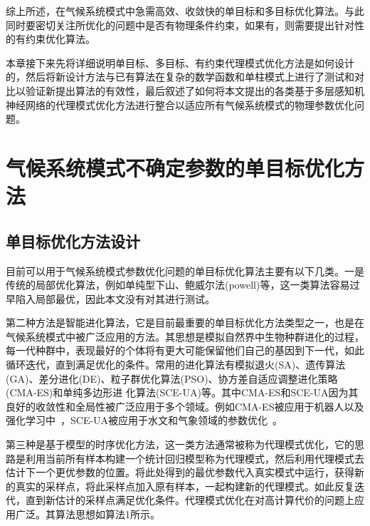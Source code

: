 综上所述，在气候系统模式中急需高效、收敛快的单目标和多目标优化算法。与此同时要密切关注所优化的问题中是否有物理条件约束，如果有，则需要提出针对性的有约束优化算法。

本章接下来先将详细说明单目标、多目标、有约束代理模式优化方法是如何设计的，然后将新设计方法与已有算法在复杂的数学函数和单柱模式上进行了测试和对比以验证新提出算法的有效性，最后叙述了如何将本文提出的各类基于多层感知机神经网络的代理模式优化方法进行整合以适应所有气候系统模式的物理参数优化问题。


\section{气候系统模式不确定参数的单目标优化方法}
\subsection{单目标优化方法设计}
目前可以用于气候系统模式参数优化问题的单目标优化算法主要有以下几类。一是传统的局部优化算法，例如单纯型下山、鲍威尔法(powell)等，这一类算法容易过早陷入局部最优，因此本文没有对其进行测试。

第二种方法是智能进化算法，它是目前最重要的单目标优化方法类型之一，也是在气候系统模式中被广泛应用的方法。其思想是模拟自然界中生物种群进化的过程，每一代种群中，表现最好的个体将有更大可能保留他们自己的基因到下一代，如此循环迭代，直到满足优化的条件。常用的进化算法有模拟退火(SA)、遗传算法(GA)、差分进化(DE)、粒子群优化算法(PSO)、协方差自适应调整进化策略(CMA-ES)和单纯多边形进
化算法(SCE-UA)等。其中CMA-ES和SCE-UA因为其良好的收敛性和全局性被广泛应用于多个领域。例如CMA-ES被应用于机器人以及强化学习中~\cite{wang2010optimizing,salimans2017evolution}，SCE-UA被应用于水文和气象领域的参数优化~\cite{duan1993shuffled,江净超2017知识驱动下的水文模型参数智能化设置方法,ma2006application}。

第三种是基于模型的时序优化方法，这一类方法通常被称为代理模式优化，它的思路是利用当前所有样本构建一个统计回归模型称为代理模式，然后利用代理模式去估计下一个更优参数的位置。将此处得到的最优参数代入真实模式中运行，获得新的真实的采样点，将此采样点加入原有样本，一起构建新的代理模式。如此反复迭代，直到新估计的采样点满足优化条件。代理模式优化在对高计算代价的问题上应用广泛。其算法思想如算法1所示。

